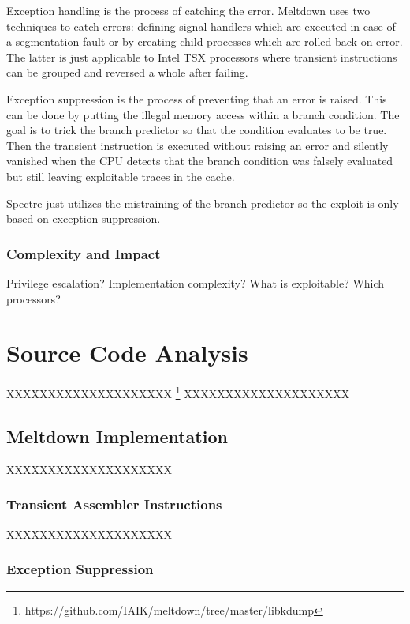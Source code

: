 \documentclass[a4paper,oneside,openright] {scrreprt}
\begin{document}
Exception handling is the process of catching the error. Meltdown uses two techniques to catch errors: defining signal handlers
which are executed in case of a segmentation fault or by creating child processes which are rolled back on error.
The latter is just applicable to Intel TSX processors where transient instructions can be grouped and reversed a whole after failing.

Exception suppression is the process of preventing that an error is raised. This can be done by putting the illegal memory access
within a branch condition. The goal is to trick the branch predictor so that the condition evaluates to be true.
Then the transient instruction is executed without raising an error and silently vanished when the CPU detects that the branch
condition was falsely evaluated but still leaving exploitable traces in the cache.

Spectre just utilizes the mistraining of the branch predictor so the exploit is only based on exception suppression.

\subsection{Complexity and Impact}
\label{ch:intro:motivation:A}

Privilege escalation?
Implementation complexity?
What is exploitable?
Which processors?

\chapter{Source Code Analysis}
\label{ch:sourceCodeAnalysis}

XXXXXXXXXXXXXXXXXXXX
\footnote{https://github.com/IAIK/meltdown/tree/master/libkdump}
XXXXXXXXXXXXXXXXXXXX

\section{Meltdown Implementation}
\label{ch:intro:motivation}

XXXXXXXXXXXXXXXXXXXX


\subsection{Transient Assembler Instructions}
\label{ch:intro:motivation:A}

XXXXXXXXXXXXXXXXXXXX

\subsection{Exception Suppression}
\label{ch:intro:motivation:A}
\end{document}
